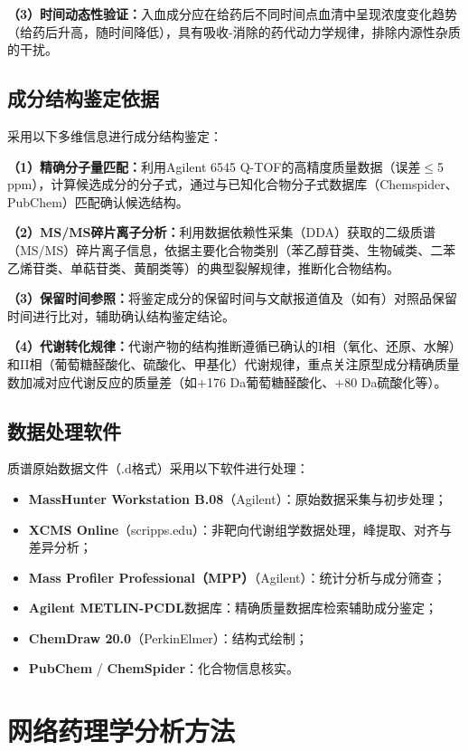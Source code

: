 \documentclass[12pt,a4paper,UTF8,openany]{ctexbook}
\begin{document}
\textbf{（3）时间动态性验证：}入血成分应在给药后不同时间点血清中呈现浓度变化趋势（给药后升高，随时间降低），具有吸收-消除的药代动力学规律，排除内源性杂质的干扰。

\subsection{成分结构鉴定依据}

采用以下多维信息进行成分结构鉴定：

\textbf{（1）精确分子量匹配：}利用Agilent 6545 Q-TOF的高精度质量数据（误差$\leq$5 ppm），计算候选成分的分子式，通过与已知化合物分子式数据库（Chemspider、PubChem）匹配确认候选结构。

\textbf{（2）MS/MS碎片离子分析：}利用数据依赖性采集（DDA）获取的二级质谱（MS/MS）碎片离子信息，依据主要化合物类别（苯乙醇苷类、生物碱类、二苯乙烯苷类、单萜苷类、黄酮类等）的典型裂解规律，推断化合物结构。

\textbf{（3）保留时间参照：}将鉴定成分的保留时间与文献报道值及（如有）对照品保留时间进行比对，辅助确认结构鉴定结论。

\textbf{（4）代谢转化规律：}代谢产物的结构推断遵循已确认的I相（氧化、还原、水解）和II相（葡萄糖醛酸化、硫酸化、甲基化）代谢规律，重点关注原型成分精确质量数加减对应代谢反应的质量差（如$+$176 Da葡萄糖醛酸化、$+$80 Da硫酸化等）。

\subsection{数据处理软件}

质谱原始数据文件（.d格式）采用以下软件进行处理：

\begin{itemize}
  \item \textbf{MassHunter Workstation B.08}（Agilent）：原始数据采集与初步处理；
  \item \textbf{XCMS Online}（scripps.edu）：非靶向代谢组学数据处理，峰提取、对齐与差异分析；
  \item \textbf{Mass Profiler Professional（MPP）}（Agilent）：统计分析与成分筛查；
  \item \textbf{Agilent METLIN-PCDL}数据库：精确质量数据库检索辅助成分鉴定；
  \item \textbf{ChemDraw 20.0}（PerkinElmer）：结构式绘制；
  \item \textbf{PubChem} / \textbf{ChemSpider}：化合物信息核实。
\end{itemize}

\section{网络药理学分析方法}
\end{document}
